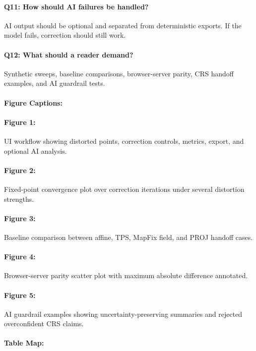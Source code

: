 \documentclass{article}
\begin{document}
\paragraph{Q11: How should AI failures be handled?}
AI output should be optional and separated from deterministic exports. If the model fails, correction should still work.

\paragraph{Q12: What should a reader demand?}
Synthetic sweeps, baseline comparisons, browser-server parity, CRS handoff examples, and AI guardrail tests.

\paragraph{Figure Captions:}

\paragraph{Figure 1:}
UI workflow showing distorted points, correction controls, metrics, export, and optional AI analysis.

\paragraph{Figure 2:}
Fixed-point convergence plot over correction iterations under several distortion strengths.

\paragraph{Figure 3:}
Baseline comparison between affine, TPS, MapFix field, and PROJ handoff cases.

\paragraph{Figure 4:}
Browser-server parity scatter plot with maximum absolute difference annotated.

\paragraph{Figure 5:}
AI guardrail examples showing uncertainty-preserving summaries and rejected overconfident CRS claims.

\paragraph{Table Map:}
\end{document}
